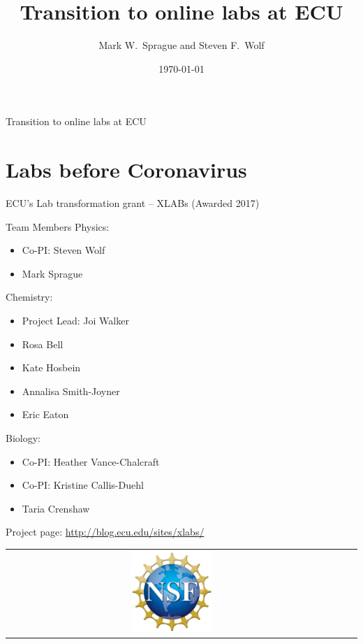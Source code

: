 \documentclass[aspectratio=169,shadow=true]{beamer}
\title[ECU online labs]{Transition to online labs at ECU}
\author[Sprague and Wolf]{Mark W.\ Sprague and Steven F.\ Wolf}
\institute[ECU]{East Carolina University}
\date{\today}
\begin{document}
\begin{frame}
  \titlepage
\end{frame}

\begin{frame}
  {Transition to online labs at ECU}
  \tableofcontents
\end{frame}

\section{Labs before Coronavirus}
\begin{frame}{ECU's Lab transformation grant -- XLABs (Awarded 2017)}
  \noindent
  \begin{minipage}{0.35\textwidth}\scriptsize
    \begin{block}{Team Members}
      Physics:
      \begin{itemize}
        \item Co-PI: Steven Wolf
        \item Mark Sprague
      \end{itemize}
      Chemistry:
      \begin{itemize}
        \item Project Lead: Joi Walker
        \item Rosa Bell
        \item Kate Hosbein
        \item Annalisa Smith-Joyner
        \item Eric Eaton
      \end{itemize}
      Biology:
      \begin{itemize}
        \item Co-PI: Heather Vance-Chalcraft
        \item Co-PI: Kristine Callis-Duehl
        \item Taria Crenshaw
      \end{itemize}
    \end{block}
  \end{minipage}\hfill%
  \begin{minipage}[b]{0.6\textwidth}\scriptsize
    \begin{block}{Project page:}
      \centering \url{http://blog.ecu.edu/sites/xlabs/}
    \end{block}
    \begin{center}
      \begin{tabular}{ccc}
        \includegraphics[width=0.25\textwidth]{./logos/NSF_4-Color_bitmap_Logo.png}

\end{tabular}
\end{center}
\end{minipage}
\end{frame}
\end{document}
